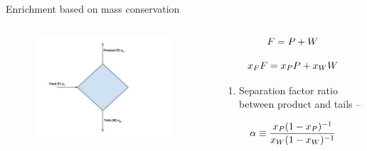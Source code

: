 \documentclass[aspectratio=1610,pdftex,dvipsnames,compress,xcolor={dvipsnames}]{beamer}
\begin{document}
\begin{frame}{Enrichment based on mass conservation}
    \begin{columns}[t]

        \begin{column}{0.40\textwidth}
            \begin{figure}
                \centering
                \includegraphics[width=0.95\textwidth]{enrichment_material.flow.jpg}
            \end{figure}
        \end{column}

        \begin{column}{0.60\textwidth}
            \begin{equation}
                \LARGE
                F = P + W
            \end{equation}
            
            \begin{equation}
                \LARGE
                x_F F = x_P P +x_W W
            \end{equation}
            
            \vspace*{\fill}

            \begin{enumerate}[series=outerlist,topsep=0pt,itemsep=21pt,leftmargin=*,label=(\arabic*)]
                \item[]Separation factor ratio between product and tails --
            \end{enumerate}
            
            \vspace*{\fill}

            \begin{equation}
                \LARGE
                \alpha \equiv \frac{x_P(1-x_P)^{-1}}{x_W(1-x_W)^{-1}}
            \end{equation}
        \end{column}

    \end{columns}
\end{frame}
\end{document}
